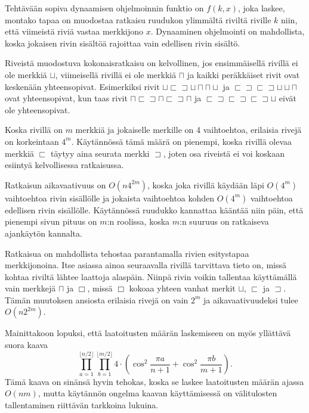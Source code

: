 Tehtävään sopiva dynaamisen ohjelmoinnin funktio on $f(k,x)$,
joka laskee, montako tapaa on muodostaa ratkaisu
ruudukon ylimmältä riviltä riville $k$ niin,
että viimeistä riviä vastaa merkkijono $x$.
Dynaaminen ohjelmointi on mahdollista,
koska jokaisen rivin sisältöä
rajoittaa vain edellisen rivin sisältö.

Riveistä muodostuva kokonaisratkaisu on kelvollinen,
jos ensimmäisellä rivillä ei ole merkkiä $\sqcup$,
viimeisellä rivillä ei ole merkkiä $\sqcap$
ja kaikki peräkkäiset rivit ovat keskenään yhteensopivat.
Esimerkiksi rivit
$\sqcup \sqsubset \sqsupset \sqcup \sqcap \sqcap \sqcup$ ja
$\sqsubset \sqsupset \sqsubset \sqsupset \sqcup \sqcup \sqcap$ 
ovat yhteensopivat,
kun taas rivit
$\sqcap \sqsubset \sqsupset \sqcap \sqsubset \sqsupset \sqcap$ ja
$\sqsubset \sqsupset \sqsubset \sqsupset \sqsubset \sqsupset \sqcup$
eivät ole yhteensopivat.

Koska rivillä on $m$ merkkiä ja jokaiselle merkille on 4
vaihtoehtoa, erilaisia rivejä on korkeintaan $4^m$.
Käytännössä tämä määrä on pienempi,
koska rivillä olevaa merkkiä $\sqsubset$
täytyy aina seurata merkki $\sqsupset$,
joten osa riveistä ei voi koskaan esiintyä
kelvollisessa ratkaisussa.

Ratkaisun aikavaativuus on $O(n 4^{2m})$,
koska joka rivillä käydään läpi $O(4^m)$
vaihtoehtoa rivin sisällölle
ja jokaista vaihtoehtoa kohden $O(4^m)$
vaihtoehtoa edellisen rivin sisällölle.
Käytännössä ruudukko kannattaa kääntää niin
päin, että pienempi sivun pituus on $m$:n roolissa,
koska $m$:n suuruus on ratkaiseva ajankäytön kannalta.

Ratkaisua on mahdollista tehostaa parantamalla rivien esitystapaa merkkijonoina.
Itse asiassa ainoa seuraavalla rivillä tarvittava tieto on,
missä kohtaa riviltä lähtee laattoja alaspäin.
Niinpä rivin voikin tallentaa käyttämällä vain merkkejä
$\sqcap$ ja $\Box$, missä $\Box$ kokoaa yhteen vanhat merkit
$\sqcup$, $\sqsubset$ ja $\sqsupset$.
Tämän muutoksen ansiosta erilaisia rivejä on vain $2^m$
ja aikavaativuudeksi tulee $O(n 2^{2m})$.

Mainittakoon lopuksi, että laatoitusten määrän laskemiseen
on myös yllättävä suora kaava
\[ \prod_{a=1}^{\lfloor n/2 \rfloor} \prod_{b=1}^{\lfloor m/2 \rfloor} 4 \cdot (\cos^2 \frac{\pi a}{n + 1} + \cos^2 \frac{\pi b}{m+1}).\]
Tämä kaava on sinänsä hyvin tehokas,
koska se laskee laatoitusten määrän ajassa $O(nm)$,
mutta käytännön ongelma kaavan käyttämisessä
on välitulosten tallentaminen riittävän tarkkoina lukuina.
